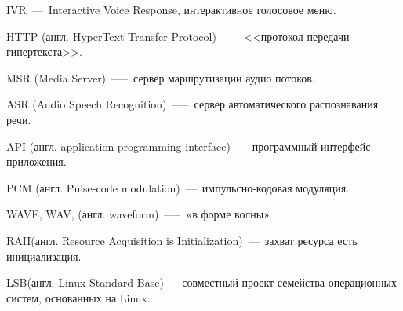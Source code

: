 
\hypertarget{ivr}{IVR~---~Interactive Voice Response, интерактивное голосовое меню.}

\hypertarget{http}{HTTP (англ. HyperText Transfer Protocol)~—--~<<протокол передачи \\ \mbox{гипертекста}>>.}

\hypertarget{msr}{MSR (Media Server)~—--~сервер маршрутизации аудио потоков.}

\hypertarget{asr}{ASR (Audio Speech Recognition)~—--~сервер автоматического распознавания речи.}

\hypertarget{api}{API (англ. application programming interface)~---~программный интерфейс приложения.}

\hypertarget{pcm}{PCM (англ. Pulse-code modulation)~---~импульсно-кодовая модуляция.}

\hypertarget{wav}{WAVE, WAV, (англ. waveform)~—--~«в форме волны».}

\hypertarget{raii}{RAII(англ. Resource Acquisition is Initialization)~---~захват ресурса есть инициализация.}

\hypertarget{lsb}{LSB(англ. Linux Standard Base) — совместный проект семейства операционных систем, основанных на Linux.}

\clearpage
